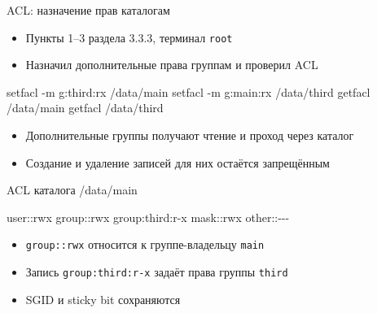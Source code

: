 \documentclass[
  ignorenonframetext,
  aspectratio=169,
  russian,
]{beamer}
\newenvironment{Shaded}{\begin{snugshade}}{\end{snugshade}}
\newcommand{\AttributeTok}[1]{\textcolor[rgb]{0.40,0.45,0.13}{#1}}
\newcommand{\ExtensionTok}[1]{\textcolor[rgb]{0.00,0.23,0.31}{#1}}
\newcommand{\NormalTok}[1]{\textcolor[rgb]{0.00,0.23,0.31}{#1}}
\providecommand{\tightlist}{%
  \setlength{\itemsep}{0pt}\setlength{\parskip}{0pt}}
\begin{document}
\begin{frame}[fragile]{ACL: назначение прав каталогам}
\protect{}\label{acl-ux43dux430ux437ux43dux430ux447ux435ux43dux438ux435-ux43fux440ux430ux432-ux43aux430ux442ux430ux43bux43eux433ux430ux43c}
\begin{itemize}
\tightlist
\item
  Пункты 1--3 раздела 3.3.3, терминал \texttt{root}
\item
  Назначил дополнительные права группам и проверил ACL
\end{itemize}

\begin{Shaded}
\begin{Highlighting}[]
\ExtensionTok{setfacl} \AttributeTok{{-}m}\NormalTok{ g:third:rx /data/main}
\ExtensionTok{setfacl} \AttributeTok{{-}m}\NormalTok{ g:main:rx /data/third}
\ExtensionTok{getfacl}\NormalTok{ /data/main}
\ExtensionTok{getfacl}\NormalTok{ /data/third}
\end{Highlighting}
\end{Shaded}

\begin{itemize}
\tightlist
\item
  Дополнительные группы получают чтение и проход через каталог
\item
  Создание и удаление записей для них остаётся запрещённым
\end{itemize}
\end{frame}

\begin{frame}[fragile]{ACL каталога /data/main}
\protect{}\label{acl-ux43aux430ux442ux430ux43bux43eux433ux430-datamain}
\begin{Shaded}
\begin{Highlighting}[]
\NormalTok{user::rwx}
\NormalTok{group::rwx}
\NormalTok{group:third:r{-}x}
\NormalTok{mask::rwx}
\NormalTok{other::{-}{-}{-}}
\end{Highlighting}
\end{Shaded}

\begin{itemize}
\tightlist
\item
  \texttt{group::rwx} относится к группе-владельцу \texttt{main}
\item
  Запись \texttt{group:third:r-x} задаёт права группы \texttt{third}
\item
  SGID и sticky bit сохраняются
\end{itemize}
\end{frame}
\end{document}

